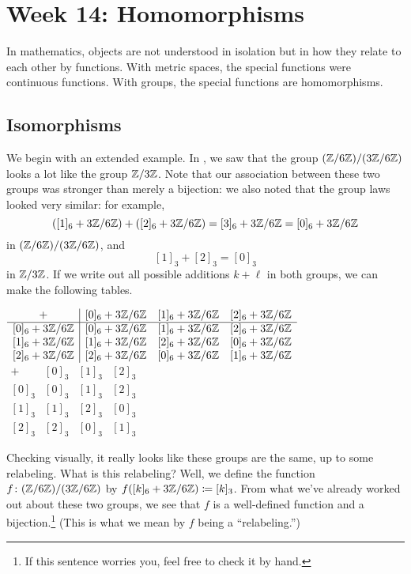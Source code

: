 \documentclass[../main.tex]{subfiles}
\begin{document}
\section{Week 14: Homomorphisms}
In mathematics, objects are not understood in isolation but in how they relate to each other by functions. With metric spaces, the special functions were continuous functions. With groups, the special functions are homomorphisms.

\subsection{Isomorphisms}
We begin with an extended example. In , we saw that the group $(\mathbb Z/6\mathbb Z)/(3\mathbb Z/6\mathbb Z)$ looks a lot like the group $\mathbb Z/3\mathbb Z$. Note that our association between these two groups was stronger than merely a bijection: we also noted that the group laws looked very similar: for example,
\[([1]_6+3\mathbb Z/6\mathbb Z)+([2]_6+3\mathbb Z/6\mathbb Z)=[3]_6+3\mathbb Z/6\mathbb Z=[0]_6+3\mathbb Z/6\mathbb Z\]
in $(\mathbb Z/6\mathbb Z)/(3\mathbb Z/6\mathbb Z)$, and
\[[1]_3+[2]_3=[0]_3\]
in $\mathbb Z/3\mathbb Z$. If we write out all possible additions $k+\ell$ in both groups, we can make the following tables.
\begin{center}
    $\begin{array}{c|ccc}
        +               & [0]_6+3\mathbb Z/6\mathbb Z & [1]_6+3\mathbb Z/6\mathbb Z & [2]_6+3\mathbb Z/6\mathbb Z \\\hline
        {}[0]_6+3\mathbb Z/6\mathbb Z & [0]_6+3\mathbb Z/6\mathbb Z & [1]_6+3\mathbb Z/6\mathbb Z & [2]_6+3\mathbb Z/6\mathbb Z \\
        {}[1]_6+3\mathbb Z/6\mathbb Z & [1]_6+3\mathbb Z/6\mathbb Z & [2]_6+3\mathbb Z/6\mathbb Z & [0]_6+3\mathbb Z/6\mathbb Z \\
        {}[2]_6+3\mathbb Z/6\mathbb Z & [2]_6+3\mathbb Z/6\mathbb Z & [0]_6+3\mathbb Z/6\mathbb Z & [1]_6+3\mathbb Z/6\mathbb Z 
    \end{array}$
    \qquad
    $\begin{array}{c|ccc}
        +     & [0]_3 & [1]_3 & [2]_3 \\\hline
        {}[0]_3 & [0]_3 & [1]_3 & [2]_3 \\
        {}[1]_3 & [1]_3 & [2]_3 & [0]_3 \\
        {}[2]_3 & [2]_3 & [0]_3 & [1]_3
    \end{array}$
\end{center}
Checking visually, it really looks like these groups are the same, up to some relabeling. What is this relabeling? Well, we define the function $f\colon(\mathbb Z/6\mathbb Z)/(3\mathbb Z/6\mathbb Z)$ by $f([k]_6+3\mathbb Z/6\mathbb Z)\coloneqq[k]_3$. From what we've already worked out about these two groups, we see that $f$ is a well-defined function and a bijection.\footnote{If this sentence worries you, feel free to check it by hand.} (This is what we mean by $f$ being a ``relabeling.'')
\end{document}
